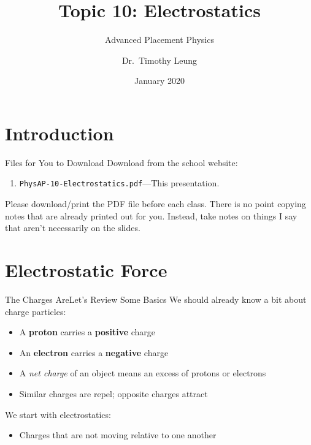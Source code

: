 \documentclass[12pt,aspectratio=169]{beamer}
\title{Topic 10: Electrostatics}
\subtitle{Advanced Placement Physics}
\author[TML]{Dr.\ Timothy Leung}
\institute{Olympiads School, Toronto, ON, Canada}
\date{January 2020}
\begin{document}
\begin{frame}
  \maketitle
\end{frame}


\section[Intro]{Introduction}

\begin{frame}{Files for You to Download}
  Download from the school website:
  \begin{enumerate}
  \item\texttt{PhysAP-10-Electrostatics.pdf}---This presentation.
  \end{enumerate}
  Please download/print the PDF file before each class. There is no point
  copying notes that are already printed out for you. Instead, take notes on
  things I say that aren't necessarily on the slides.
\end{frame}


\section{Electrostatic Force}

\begin{frame}{The Charges Are}{Let's Review Some Basics}
  We should already know a bit about charge particles:
  \begin{itemize}
  \item A \textbf{proton} carries a \textbf{positive} charge
  \item An \textbf{electron} carries a \textbf{negative} charge
  \item A \emph{net charge} of an object means an excess of protons or electrons
  \item Similar charges are repel; opposite charges attract
  \end{itemize}

  \vspace{.2in}We start with electrostatics:
  \begin{itemize}
  \item Charges that are not moving relative to one another
  \end{itemize}
\end{frame}
\end{document}

